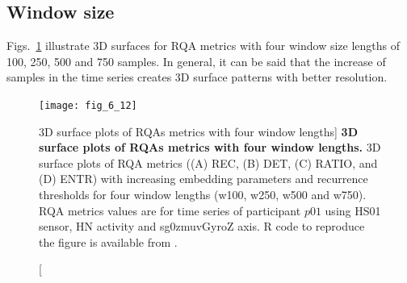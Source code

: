 \subsection{Window size}
Figs.~\ref{fig:topo_windows} illustrate 3D surfaces for RQA metrics 
with four window size lengths of 100, 250, 500 and 750 samples.
In general, it can be said that the increase of samples in the time series 
creates 3D surface patterns with better resolution.
\begin{figure}
\centering
\texttt{[image: fig\_6\_12]}
    \caption
	[3D surface plots of RQAs metrics with four window lengths]{
	{\bf 3D surface plots of RQAs metrics with four window lengths.}
	3D surface plots of RQA metrics ((A) REC, (B) DET, (C) RATIO, and (D) ENTR) 
	with increasing embedding 
	parameters and recurrence thresholds for four window 
	lengths (w100, w250, w500 and  w750).
	RQA metrics values are for time series of participant $p01$ 
	using HS01 sensor, HN activity and sg0zmuvGyroZ axis.
	R code to reproduce the figure is available from \cite{hwum2018}.
        }
\label{fig:topo_windows}
\end{figure}

\newpage

